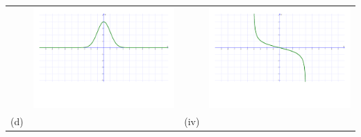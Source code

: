 \documentclass[12pt]{article}
\begin{document}
\begin{enumerate}
\begin{center}
\begin{tabular}{cc|cc}
&\includegraphics[scale=0.218]{match3.pdf} & & \includegraphics[scale=0.218]{matcha.pdf}\\
(d) && (iv)&\\

\end{tabular}
\end{center}
\end{enumerate}
\end{document}

